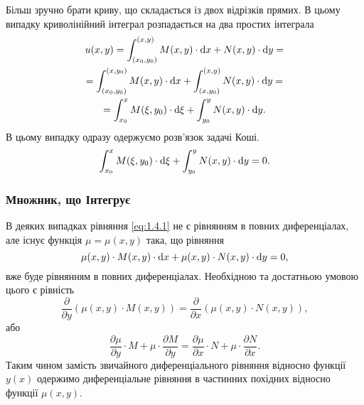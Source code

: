 Більш зручно брати криву, що складається із двох відрізків прямих. В цьому випадку криволінійний інтеграл розпадається на два простих інтеграла
\begin{multline}
	\label{eq:1.4.9}
	u(x, y) = \int_{(x_0, y_0)}^{(x,y)} M(x,y) \cdot \mathop{}\!\mathrm{d} x + N(x, y) \cdot \mathop{}\!\mathrm{d} y = \\
	= \int_{(x_0, y_0)}^{(x,y_0)} M(x,y) \cdot \mathop{}\!\mathrm{d} x + \int_{(x,y_0)}^{(x,y)} N(x, y) \cdot \mathop{}\!\mathrm{d} y = \\
	= \int_{x_0}^{x} M(\xi,y_0) \cdot \mathop{}\!\mathrm{d} \xi + \int_{y_0}^{y} N(x, y) \cdot \mathop{}\!\mathrm{d} y.
\end{multline}
В цьому випадку одразу одержуємо розв’язок задачі Коші.
\begin{equation}
	\label{eq:1.4.10}
	\int_{x_0}^{x} M(\xi,y_0) \cdot \mathop{}\!\mathrm{d} \xi + \int_{y_0}^{y} N(x, y) \cdot \mathop{}\!\mathrm{d} y = 0.
\end{equation}

\subsubsection{Множник, що Інтегрує}
В деяких випадках рівняння \eqref{eq:1.4.1} не є рівнянням в повних диференціалах, але існує функція $\mu = \mu(x,y)$ така, що рівняння
\begin{equation}
	\label{eq:1.4.11}
	\mu(x,y) \cdot M(x, y) \cdot \mathop{}\!\mathrm{d} x + \mu(x,y) \cdot N(x, y) \cdot \mathop{}\!\mathrm{d} y = 0,
\end{equation}
вже буде рівнянням в повних диференціалах. Необхідною та достатньою умовою цього є рівність
\begin{equation}
	\label{eq:1.4.12}
	\frac{\partial}{\partial y} (\mu(x,y) \cdot M(x, y)) = \frac{\partial}{\partial x} (\mu(x,y) \cdot N(x, y)),
\end{equation}
або
\begin{equation}
	\label{eq:1.4.13}
	\frac{\partial \mu}{\partial y} \cdot M + \mu \cdot \frac{\partial M}{\partial y} = \frac{\partial \mu}{\partial x} \cdot N + \mu \cdot \frac{\partial N}{\partial x}.
\end{equation}
Таким чином замість звичайного диференціального рівняння відносно функції $y(x)$ одержимо диференціальне рівняння в частинних похідних відносно функції $\mu(x, y)$. \\

